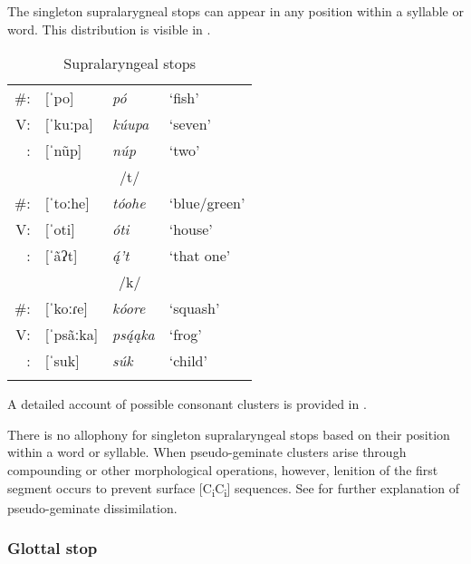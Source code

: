 The singleton supralarygneal stops can appear in any position within a syllable or word. This distribution is visible in .

\begin{table}
\caption{Supralaryngeal stops}\label{suprastops}
\begin{tabular}{rlll}
\lsptoprule
                   \multicolumn{4}{c}{/p/}                      \\
\midrule
{\#{\longrule}}: & [ˈpo]      & \textit{pó}       & `fish'       \\
V{\longrule}:   & [ˈkuːpa]   & \textit{kúupa}    & `seven'      \\
{\longrule}:    & [ˈnũp]    & \textit{núp}      & `two'        \\
\midrule
                   \multicolumn{4}{c}{/t/}                      \\
\midrule
{\#{\longrule}}: & [ˈtoːhe]   & \textit{tóohe}    & `blue/green' \\
V{\longrule}:   & [ˈoti]     & \textit{óti}      & `house'      \\
{\longrule}:    & [ˈãʔt]    & \textit{ą́'t}     & `that one'   \\
\midrule
                   \multicolumn{4}{c}{/k/}                      \\
\midrule
{\#{\longrule}}: & [ˈkoːɾe]   & \textit{kóore}    & `squash'     \\
V{\longrule}:   & [ˈpsãːka] & \textit{psą́ąka} & `frog'       \\
{\longrule}:    & [ˈsuk]     & \textit{súk}      & `child'     \\
\lspbottomrule
\end{tabular}
\end{table}

A detailed account of possible consonant clusters is provided in .

There is no allophony for singleton supralaryngeal stops based on their position within a word or syllable. When pseudo-geminate clusters arise through compounding or other morphological operations, however, lenition of the first segment occurs to prevent surface [C\textsubscript{i}C\textsubscript{i}] sequences. See  for further explanation of pseudo-geminate dissimilation.

\subsubsection{Glottal stop}\label{glottalstop}


